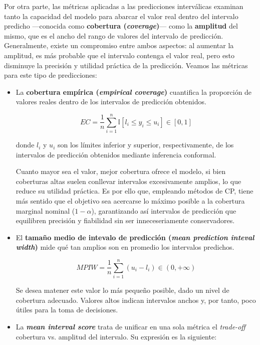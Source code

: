 Por otra parte, las métricas aplicadas a las predicciones interválicas examinan tanto la capacidad del modelo para abarcar el valor real dentro del intervalo predicho ---conocida como \textbf{cobertura (\textit{coverage})}--- como la \textbf{amplitud} del mismo, que es el ancho del rango de valores del intervalo de predicción. Generalmente, existe un compromiso entre ambos aspectos: al aumentar la amplitud, es más probable que el intervalo contenga el valor real, pero esto disminuye la precisión y utilidad práctica de la predicción. Veamos las métricas para este tipo de predicciones: 

\begin{itemize}
    \item La \textbf{cobertura empírica (\textit{empirical coverage})} cuantifica la proporción de valores reales dentro de los intervalos de predicción obtenidos. 
    
    $$
    EC = \frac{1}{n} 
        \sum_{i=1}^n{ \mathbb{I} \left[ l_i \le y_i \le u_i \right] } 
            \in \left[0, 1\right]
    $$

    donde $l_i$ y $u_i$ son los límites inferior y superior, respectivamente, de los intervalos de predicción obtenidos mediante inferencia conformal.

    Cuanto mayor sea el valor, mejor cobertura ofrece el modelo, si bien coberturas altas suelen conllevar intervalos excesivamente amplios, lo que reduce su utilidad práctica. Es por ello que, empleando métodos de \acrshort{CP}, tiene más sentido que el objetivo sea acercarse lo máximo posible a la cobertura marginal nominal ($1-\alpha$), garantizando así intervalos de predicción que equilibren precisión y fiabilidad sin ser inneceseriamente conservadores. 
    
    \item El \textbf{tamaño medio de intevalo de predicción (\textit{mean prediction inteval width})} mide qué tan amplios son en promedio los intervalos predichos.
    
    $$
    MPIW = \frac{1}{n} \sum_{i=1}^n{ \left( u_i - l_i \right) } \in (0, +\infty)
    $$
    
    Se desea matener este valor lo más pequeño posible, dado un nivel de cobertura adecuado. Valores altos indican intervalos anchos y, por tanto, poco útiles para la toma de decisiones. 

    \item La \textbf{\textit{mean interval score}} \cite{gneiting2007} trata de unificar en una sola métrica el \textit{trade-off} cobertura vs. amplitud del intervalo. Su expresión es la siguiente:


\end{itemize}

